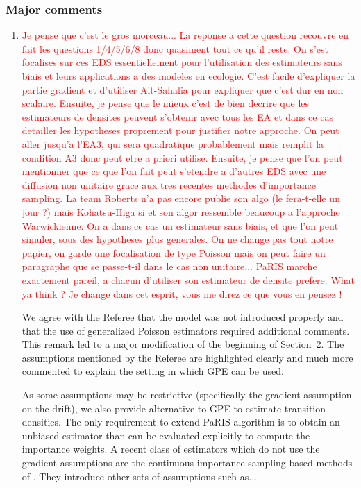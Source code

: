 \documentclass[12pt]{article}
\newcommand{\1}{\mathrm{1}}
\begin{document}
\subsubsection*{Major comments}
\begin{enumerate}
\item \textcolor{red}{Je pense que c'est le gros morceau... La reponse a cette question recouvre en fait les questions 1/4/5/6/8 donc quasiment tout ce qu'il reste.
On s'est focalises sur ces EDS essentiellement pour l'utilisation des estimateurs sans biais et leurs applications a des modeles en ecologie. C'est facile d'expliquer la partie gradient et d'utiliser Ait-Sahalia pour expliquer que c'est dur en non scalaire. Ensuite, je pense que le mieux c'est de bien decrire que les estimateurs de densites peuvent s'obtenir avec tous les EA et dans ce cas detailler les hypotheses proprement pour justifier notre approche. On peut aller jusqu'a l'EA3, qui sera quadratique probablement mais remplit la condition A3 donc peut etre a priori utilise. Ensuite, je pense que l'on peut mentionner que ce que l'on fait peut s'etendre a d'autres EDS avec une diffusion non unitaire grace aux tres recentes methodes d'importance sampling. La team Roberts n'a pas encore publie son algo (le fera-t-elle un jour ?) mais Kohatsu-Higa si et son algor ressemble beaucoup a l'approche Warwickienne. On a dans ce cas un estimateur sans biais, et que l'on peut simuler, sous des hypotheses plus generales. On ne change pas tout notre papier, on garde une focalisation de type Poisson mais on peut faire un paragraphe que se passe-t-il dans le cas non unitaire... PaRIS marche exactement pareil, a chacun d'utiliser son estimateur de densite prefere. What ya think ?
Je change dans cet esprit, vous me direz ce que vous en pensez !}

\vspace{.3cm}

We agree with the Referee that the model was not introduced properly and that the use of generalized Poisson estimators required additional comments. This remark led to a major modification of the beginning of Section~2. The assumptions mentioned by the Referee are highlighted clearly and much more commented to explain the setting in which GPE can be used. 

As some assumptions may be restrictive (specifically the gradient assumption on the drift), we also provide alternative to GPE to estimate transition densities. The only requirement to extend PaRIS algorithm is to obtain an unbiased estimator than can be evaluated explicitly to compute the importance weights. A recent class of estimators which do not use the gradient assumptions are the continuous importance sampling based methods of \cite{}. They introduce other sets of assumptions such as... 



\end{enumerate}
\end{document}
